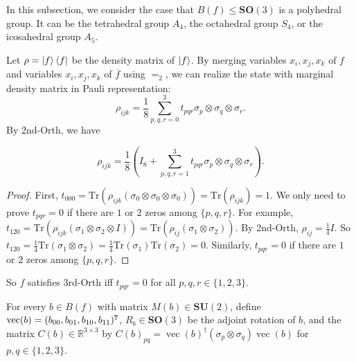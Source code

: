 In this subsection, we consider the case that $B(f)\le \mathbf{SO}(3)$ is a polyhedral group.
It can be the tetrahedral group $A_4$, the octahedral group $S_4$, or the icosahedral group $A_5$.

Let $\rho=\ket{f}\bra{f}$ be the density matrix of $\ket{f}$.
By merging variables $x_i,x_j,x_k$ of $f$ and variables $x_i,x_j,x_k$ of $\overline{f}$ using $=_2$, we can realize the state with marginal density matrix in Pauli representation:
$$\rho_{ijk}=\frac{1}{8}\sum_{p,q,r=0}^3 t_{pqr} \sigma_p\otimes\sigma_q\otimes\sigma_r.$$
By {\sc 2nd-Orth}, we have 
\begin{lemma}\label{lm: Pauli rep by 2nd-Orth}
    $$\rho_{ijk}=\frac{1}{8}\left(I_8+\sum_{p,q,r=1}^3 t_{pqr} \sigma_p\otimes\sigma_q\otimes\sigma_r\right).$$
\end{lemma}
\begin{proof}
    First, $t_{000}=\mathrm{Tr}(\rho_{ijk}(\sigma_0\otimes\sigma_0\otimes\sigma_0))=\mathrm{Tr}(\rho_{ijk})=1.$
    We only need to prove $t_{pqr}=0$ if there are $1$ or $2$ zeros among $\{p,q,r\}.$
    For example,
    $t_{120}=\mathrm{Tr}(\rho_{ijk}(\sigma_1\otimes \sigma_2\otimes I))=\mathrm{Tr}(\rho_{ij}(\sigma_1\otimes \sigma_2)).$
    By {\sc 2nd-Orth}, $\rho_{ij}=\frac{1}{4}I$.
    So $t_{120}=\frac{1}{4}\mathrm{Tr}(\sigma_1\otimes \sigma_2)=\frac{1}{4}\mathrm{Tr}(\sigma_1)\mathrm{Tr}(\sigma_2)=0.$
    Similarly, $t_{pqr}=0$ if there are $1$ or $2$ zeros among $\{p,q,r\}.$
\end{proof}


So $f$ satisfies $3$rd-Orth iff $t_{pqr}=0$ for all $p,q,r\in\{1,2,3\}.$

\begin{definition}
    For every $b\in B(f)$ with matrix $M(b)\in \mathbf{SU}(2)$, 
    define $\operatorname{vec}(b)=(b_{00},b_{01},b_{10},b_{11})^{\tt T}$, $R_b\in \mathbf{SO}(3)$ be the adjoint rotation of $b$, and the matrix $C(b)\in \mathbb{R}^{3\times 3}$ by $C(b)_{pq}=\operatorname{vec}(b)^\dagger (\sigma_p\otimes\sigma_q) \operatorname{vec}(b)$ for $p,q\in\{1,2,3\}$.
\end{definition}

